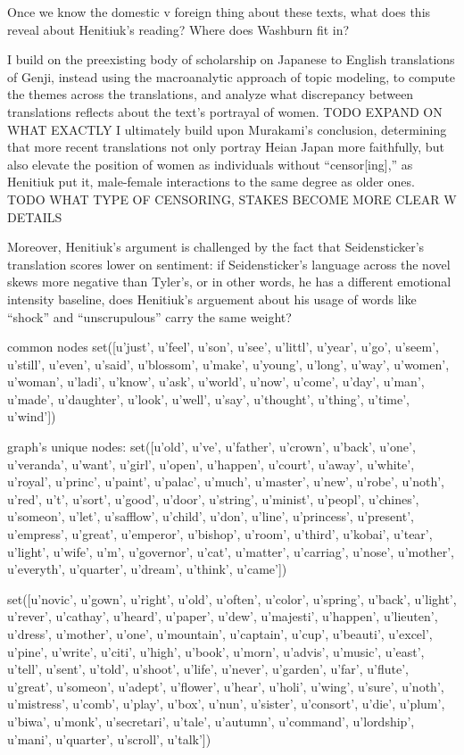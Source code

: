 \documentclass[12pt]{article}
\begin{document}
\begin{flushleft}
\begin{spacing}{2.0}
Once we know the domestic v foreign thing about these texts, what does this reveal about Henitiuk's reading? Where does Washburn fit in?

I build on the preexisting body of scholarship on Japanese to English translations of Genji, instead using the macroanalytic approach of topic modeling, to compute the themes across the translations, and analyze what discrepancy between translations reflects about the text's portrayal of women. TODO EXPAND ON WHAT EXACTLY I ultimately build upon Murakami's conclusion, determining that more recent translations not only portray Heian Japan more faithfully, but also elevate the position of women as individuals without ``censor[ing],'' as Henitiuk put it, male-female interactions to the same degree as older ones. TODO WHAT TYPE OF CENSORING, STAKES BECOME MORE CLEAR W DETAILS


Moreover, Henitiuk's argument is challenged by the fact that Seidensticker's translation scores lower on sentiment: if Seidensticker's language across the novel skews more negative than Tyler's, or in other words, he has a different emotional intensity baseline, does Henitiuk's arguement about his usage of words like ``shock'' and ``unscrupulous'' carry the same weight?


common nodes
set([u'just', u'feel', u'son', u'see', u'littl', u'year', u'go', u'seem', u'still', u'even', u'said', u'blossom', u'make', u'young', u'long', u'way', u'women', u'woman', u'ladi', u'know', u'ask', u'world', u'now', u'come', u'day', u'man', u'made', u'daughter', u'look', u'well', u'say', u'thought', u'thing', u'time', u'wind'])

graph's unique nodes:
set([u'old', u've', u'father', u'crown', u'back', u'one', u'veranda', u'want', u'girl', u'open', u'happen', u'court', u'away', u'white', u'royal', u'princ', u'paint', u'palac', u'much', u'master', u'new', u'robe', u'noth', u'red', u't', u'sort', u'good', u'door', u'string', u'minist', u'peopl', u'chines', u'someon', u'let', u'safflow', u'child', u'don', u'line', u'princess', u'present', u'empress', u'great', u'emperor', u'bishop', u'room', u'third', u'kobai', u'tear', u'light', u'wife', u'm', u'governor', u'cat', u'matter', u'carriag', u'nose', u'mother', u'everyth', u'quarter', u'dream', u'think', u'came'])

set([u'novic', u'gown', u'right', u'old', u'often', u'color', u'spring', u'back', u'light', u'rever', u'cathay', u'heard', u'paper', u'dew', u'majesti', u'happen', u'lieuten', u'dress', u'mother', u'one', u'mountain', u'captain', u'cup', u'beauti', u'excel', u'pine', u'write', u'citi', u'high', u'book', u'morn', u'advis', u'music', u'east', u'tell', u'sent', u'told', u'shoot', u'life', u'never', u'garden', u'far', u'flute', u'great', u'someon', u'adept', u'flower', u'hear', u'holi', u'wing', u'sure', u'noth', u'mistress', u'comb', u'play', u'box', u'nun', u'sister', u'consort', u'die', u'plum', u'biwa', u'monk', u'secretari', u'tale', u'autumn', u'command', u'lordship', u'mani', u'quarter', u'scroll', u'talk'])


\end{spacing}
\end{flushleft}
\end{document}
